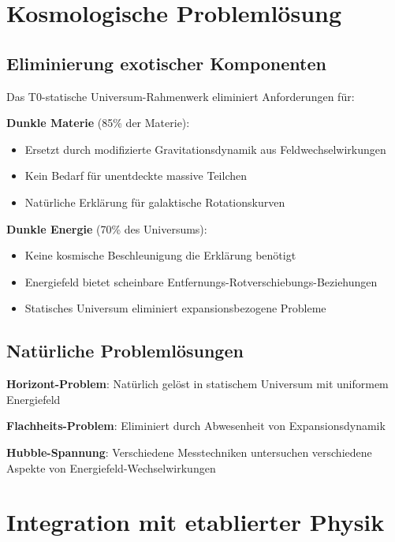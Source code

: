 \documentclass[12pt,a4paper]{article}
\begin{document}
	\section{Kosmologische Probleml\"osung}
	\label{sec:problem_resolution}
	
	\subsection{Eliminierung exotischer Komponenten}
	\label{subsec:exotic_elimination}
	
	Das T0-statische Universum-Rahmenwerk eliminiert Anforderungen f\"ur:
	
	\textbf{Dunkle Materie} (85\% der Materie):
	\begin{itemize}
		\item Ersetzt durch modifizierte Gravitationsdynamik aus Feldwechselwirkungen
		\item Kein Bedarf f\"ur unentdeckte massive Teilchen
		\item Nat\"urliche Erkl\"arung f\"ur galaktische Rotationskurven
	\end{itemize}
	
	\textbf{Dunkle Energie} (70\% des Universums):
	\begin{itemize}
		\item Keine kosmische Beschleunigung die Erkl\"arung ben\"otigt
		\item Energiefeld bietet scheinbare Entfernungs-Rotverschiebungs-Beziehungen
		\item Statisches Universum eliminiert expansionsbezogene Probleme
	\end{itemize}
	
	\subsection{Nat\"urliche Probleml\"osungen}
	\label{subsec:natural_solutions}
	
	\textbf{Horizont-Problem}: Nat\"urlich gel\"ost in statischem Universum mit uniformem Energiefeld
	
	\textbf{Flachheits-Problem}: Eliminiert durch Abwesenheit von Expansionsdynamik
	
	\textbf{Hubble-Spannung}: Verschiedene Messtechniken untersuchen verschiedene Aspekte von Energiefeld-Wechselwirkungen
	
	\section{Integration mit etablierter Physik}
	\label{sec:established_integration}
	
\end{document}
